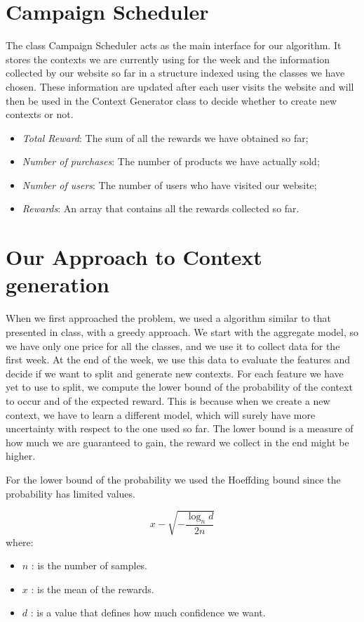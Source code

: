 \section{Campaign Scheduler}\label{sec:campaign-scheduler}
The class Campaign Scheduler acts as the main interface for our algorithm.
It stores the contexts we are currently using for the week and the information collected by our website so far in a structure indexed using the classes we have chosen.
These information are updated after each user visits the website and will then be used in the Context Generator class to decide whether to create new contexts or not.
\begin{itemize}
	\item \textit{Total Reward}: The sum of all the rewards we have obtained so far;
	\item \textit{Number of purchases}: The number of products we have actually sold;
	\item \textit{Number of users}: The number of users who have visited our website;
    \item \textit{Rewards}: An array that contains all the rewards collected so far.
\end{itemize}

\section{Our Approach to Context generation}\label{sec:our-approach-to-context-generation}
When we first approached the problem, we used a algorithm similar to that presented in class, with a greedy approach.
We start with the aggregate model, so we have only one price for all the classes, and we use it to collect data for the first week.
At the end of the week, we use this data to evaluate the features and decide if we want to split and generate new contexts.
For each feature we have yet to use to split, we compute the lower bound of the probability of the context to occur and of the expected reward.
This is because when we create a new context, we have to learn a different model, which will surely have more uncertainty with respect to the one used so far.
The lower bound is a measure of how much we are guaranteed to gain, the reward we collect in the end might be higher.

	For the lower bound of the probability we used the Hoeffding bound since the probability has limited values.

\begin{equation}
	x - \sqrt{-\frac{\log_n{d}} {2 n}}
\end{equation}
where:
\begin{itemize}
	\item $n$ : is the number of samples.
	\item $x$ : is the mean of the rewards.
	\item $d$ : is a value that defines how much confidence we want.
\end{itemize}

